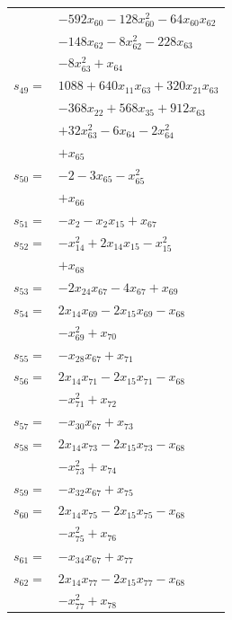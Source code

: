 \begin{longtable}{@{}r@{\;}l@{}}
 & \(\displaystyle -592x_{60} -128x_{60}^{2} -64x_{60}x_{62}\) \\
 & \(\displaystyle -148x_{62} -8x_{62}^{2} -228x_{63}\) \\
 & \(\displaystyle -8x_{63}^{2} +x_{64}\) \\[3pt]
\(s_{49}=\) & \(\displaystyle 1088 +640x_{11}x_{63} +320x_{21}x_{63}\) \\
 & \(\displaystyle -368x_{22} +568x_{35} +912x_{63}\) \\
 & \(\displaystyle +32x_{63}^{2} -6x_{64} -2x_{64}^{2}\) \\
 & \(\displaystyle +x_{65}\) \\[3pt]
\(s_{50}=\) & \(\displaystyle -2 -3x_{65} -x_{65}^{2}\) \\
 & \(\displaystyle +x_{66}\) \\[3pt]
\(s_{51}=\) & \(\displaystyle -x_{2} -x_{2}x_{15} +x_{67}\) \\[3pt]
\(s_{52}=\) & \(\displaystyle -x_{14}^{2} +2x_{14}x_{15} -x_{15}^{2}\) \\
 & \(\displaystyle +x_{68}\) \\[3pt]
\(s_{53}=\) & \(\displaystyle -2x_{24}x_{67} -4x_{67} +x_{69}\) \\[3pt]
\(s_{54}=\) & \(\displaystyle 2x_{14}x_{69} -2x_{15}x_{69} -x_{68}\) \\
 & \(\displaystyle -x_{69}^{2} +x_{70}\) \\[3pt]
\(s_{55}=\) & \(\displaystyle -x_{28}x_{67} +x_{71}\) \\[3pt]
\(s_{56}=\) & \(\displaystyle 2x_{14}x_{71} -2x_{15}x_{71} -x_{68}\) \\
 & \(\displaystyle -x_{71}^{2} +x_{72}\) \\[3pt]
\(s_{57}=\) & \(\displaystyle -x_{30}x_{67} +x_{73}\) \\[3pt]
\(s_{58}=\) & \(\displaystyle 2x_{14}x_{73} -2x_{15}x_{73} -x_{68}\) \\
 & \(\displaystyle -x_{73}^{2} +x_{74}\) \\[3pt]
\(s_{59}=\) & \(\displaystyle -x_{32}x_{67} +x_{75}\) \\[3pt]
\(s_{60}=\) & \(\displaystyle 2x_{14}x_{75} -2x_{15}x_{75} -x_{68}\) \\
 & \(\displaystyle -x_{75}^{2} +x_{76}\) \\[3pt]
\(s_{61}=\) & \(\displaystyle -x_{34}x_{67} +x_{77}\) \\[3pt]
\(s_{62}=\) & \(\displaystyle 2x_{14}x_{77} -2x_{15}x_{77} -x_{68}\) \\
 & \(\displaystyle -x_{77}^{2} +x_{78}\) \\[3pt]

\end{longtable}
